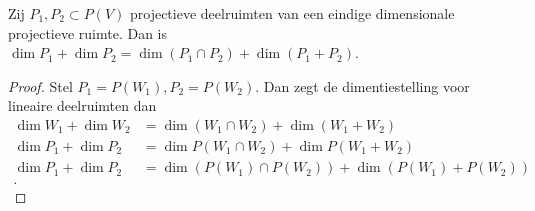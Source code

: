 \begin{stelling}[dimentiestelling]
	Zij $P_1, P_2 \subset P(V)$ projectieve deelruimten van een eindige dimensionale projectieve ruimte. Dan is $\dim P_1 + \dim P_2 = \dim (P_1 \cap P_2) + \dim (P_1 + P_2)$.
\end{stelling}
\begin{proof}
	Stel $P_1 = P(W_1), P_2 = P(W_2)$. Dan zegt de dimentiestelling voor lineaire deelruimten dan 
	\begin{align*}
		\dim W_1 + \dim W_2 &= \dim (W_1 \cap  W_2) + \dim (W_1 + W_2) \\
		\dim P_1 + \dim P_2 &=  \dim P(W_1 \cap  W_2) + \dim P(W_1 + W_2) \\
		\dim P_1 + \dim P_2 &=  \dim (P(W_1) \cap P(W_2) ) + \dim (P(W_1) + P(W_2)) \\
	.\end{align*}
\end{proof}
